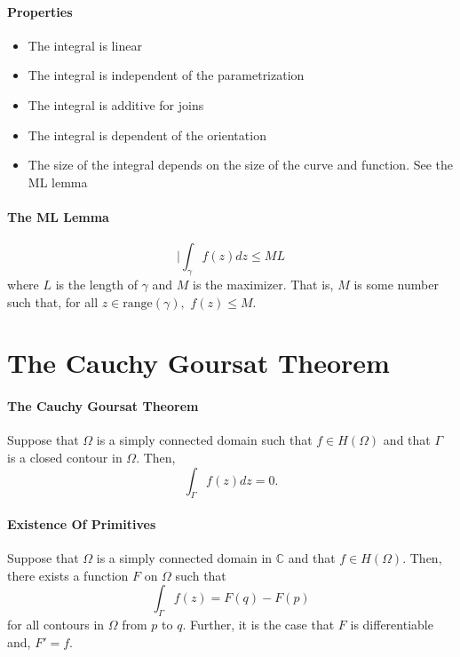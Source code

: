 \documentclass[12pt, letterpaper]{article}
\begin{document}
    \paragraph{Properties}
    \begin{itemize}
        \item The integral is linear
        \item The integral is independent of the parametrization
        \item The integral is additive for joins
        \item The integral is dependent of the orientation
        \item The size of the integral depends on the size of the curve and function. See the ML lemma
    \end{itemize}  

    \paragraph{The ML Lemma}
    \[|\int_\gamma f(z) dz \leq ML\]
    where \(L\) is the length of \(\gamma\) and \(M\) is the maximizer.
    That is, \(M\) is some number such that, for all \(z\in \mathrm{range}(\gamma),\) 
    \(f(z) \leq M\).
    
    
    \section{The Cauchy Goursat Theorem}

    \paragraph{The Cauchy Goursat Theorem}
    Suppose that \(\Omega\) is a simply connected domain such that
    \(f\in H(\Omega)\) and that \(\Gamma\) is a closed contour in \(\Omega\).
    Then,
    \[\int_\Gamma f(z) dz = 0.\]
    
    \paragraph{Existence Of Primitives}
    Suppose that \(\Omega\) is a simply connected domain in \(\mathbb{C}\)
    and that \(f\in H(\Omega)\). Then, there exists a function \(F\) on
    \(\Omega\) such that 
    \[\int_\Gamma f(z) = F(q) - F(p)\]
    for all contours in \(\Omega\) from \(p\) to \(q\).
    Further, it is the case that \(F\) is differentiable and, \(F' = f\).
 
\end{document}
